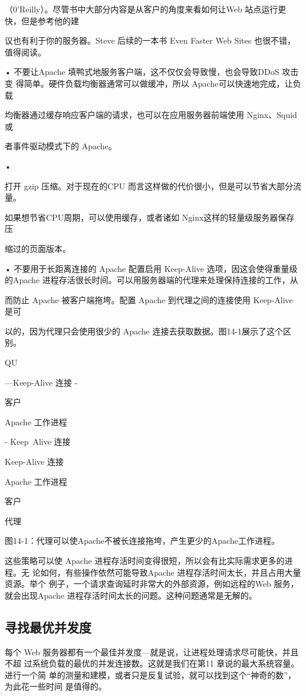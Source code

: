（0'Reilly）。尽管书中大部分内容是从客户的角度来看如何让Web 站点运行更快，但是参考他的建

议也有利于你的服务器。Steve 后续的一本书 Even Faster Web Sites 也很不错，值得阅读。

• 不要让Apache 填鸭式地服务客户端，这不仅仅会导致慢，也会导致DDoS 攻击变
得简单。硬件负载均衡器通常可以做缓冲，所以 Apache可以快速地完成，让负载

均衡器通过缓存响应客户端的请求，也可以在应用服务器前端使用 Nginx、Squid 或

者事件驱动模式下的 Apache。

•

打开 gzip 压缩。对于现在的CPU 而言这样做的代价很小，但是可以节省大部分流量。

如果想节省CPU周期，可以使用缓存，或者诸如 Nginx这样的轻量级服务器保存压

缩过的页面版本。

• 不要用于长距离连接的 Apache 配置启用 Keep-Alive 选项，因这会使得重量级
的Apache 进程存活很长时间。可以用服务器端的代理来处理保持连接的工作，从

而防止 Apache 被客户端拖垮。配置 Apache 到代理之间的连接使用 Keep-Alive 是可

以的，因为代理只会使用很少的 Apache 连接去获取数据。图14-1展示了这个区别。

QU

—Keep-Alive 连接 -

客户

Apache 工作进程

- Keep~Alive 连接

Keep-Alive 连接

Apache 工作进程

客户

代理

图14-1：代理可以使Apache不被长连接拖垮，产生更少的Apache工作进程。

这些策略可以使 Apache 进程存活时间变得很短，所以会有比实际需求更多的进程。无
论如何，有些操作依然可能导致Apache 进程存活时间太长，并且占用大量资源。举个
例子，一个请求查询延时非常大的外部资源，例如远程的Web 服务，就会出现Apache
进程存活时间太长的问题。这种问题通常是无解的。

\subsection{寻找最优并发度}
每个 Web 服务器都有一个最佳并发度—就是说，让进程处理请求尽可能快，并且不超
过系统负载的最优的并发连接数。这就是我们在第11 章说的最大系统容量。进行一个简
单的测量和建模，或者只是反复试验，就可以找到这个“神奇的数”，为此花一些时间
是值得的。

